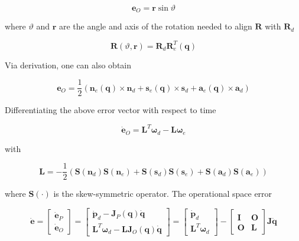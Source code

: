 \documentclass[10pt]{article}
\begin{document}
$$
\boldsymbol{e}_{O}=\boldsymbol{r} \sin \vartheta
$$

where $\vartheta$ and $\boldsymbol{r}$  are the angle and axis of the rotation needed to align $\boldsymbol{R}$ with $\boldsymbol{R}_{d}$

$$
\boldsymbol{R}(\vartheta, \boldsymbol{r})=\boldsymbol{R}_{d} \boldsymbol{R}_{e}^{T}(\boldsymbol{q})
$$


Via derivation, one can also obtain


$$
\boldsymbol{e}_{O}=\frac{1}{2}\left(\boldsymbol{n}_{e}(\boldsymbol{q}) \times \boldsymbol{n}_{d}+\boldsymbol{s}_{e}(\boldsymbol{q}) \times \boldsymbol{s}_{d}+\boldsymbol{a}_{e}(\boldsymbol{q}) \times \boldsymbol{a}_{d}\right)
$$



 Differentiating the above error vector with respect to time

$$
\dot{\boldsymbol{e}}_{O}=\boldsymbol{L}^{T} \boldsymbol{\omega}_{d}-\boldsymbol{L} \boldsymbol{\omega}_{e}
$$

with

$$
\boldsymbol{L}=-\frac{1}{2}\left(\boldsymbol{S}\left(\boldsymbol{n}_{d}\right) \boldsymbol{S}\left(\boldsymbol{n}_{e}\right)+\boldsymbol{S}\left(\boldsymbol{s}_{d}\right) \boldsymbol{S}\left(\boldsymbol{s}_{e}\right)+\boldsymbol{S}\left(\boldsymbol{a}_{d}\right) \boldsymbol{S}\left(\boldsymbol{a}_{e}\right)\right)
$$

where  $\boldsymbol{S}(\cdot)$ is the skew-symmetric operator. The operational space error

$$
\dot{\boldsymbol{e}}=\left[\begin{array}{c}
\dot{\boldsymbol{e}}_{P} \\
\dot{\boldsymbol{e}}_{O}
\end{array}\right]=\left[\begin{array}{c}
\dot{\boldsymbol{p}}_{d}-\boldsymbol{J}_{P}(\boldsymbol{q}) \dot{\boldsymbol{q}} \\
\boldsymbol{L}^{T} \boldsymbol{\omega}_{d}-\boldsymbol{L} \boldsymbol{J}_{O}(\boldsymbol{q}) \dot{\boldsymbol{q}}
\end{array}\right]=\left[\begin{array}{c}
\dot{\boldsymbol{p}}_{d} \\
\boldsymbol{L}^{T} \boldsymbol{\omega}_{d}
\end{array}\right]-\left[\begin{array}{cc}
\boldsymbol{I} & \boldsymbol{O} \\
\boldsymbol{O} & \boldsymbol{L}
\end{array}\right] \boldsymbol{J} \dot{\boldsymbol{q}}
$$
\end{document}
